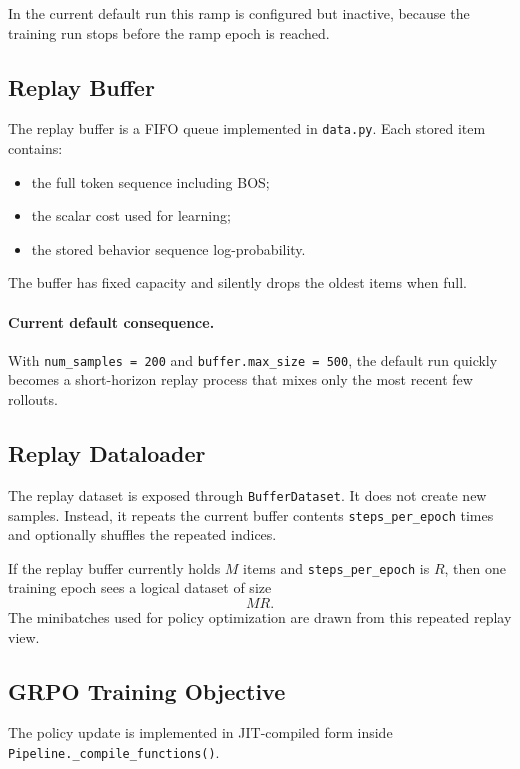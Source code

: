 \documentclass[11pt]{article}
\begin{document}
In the current default run this ramp is configured but inactive, because the training run stops before the ramp epoch is reached.

\subsection{Replay Buffer}

The replay buffer is a FIFO queue implemented in \texttt{data.py}. Each stored item contains:
\begin{itemize}[leftmargin=*]
\item the full token sequence including BOS;
\item the scalar cost used for learning;
\item the stored behavior sequence log-probability.
\end{itemize}

The buffer has fixed capacity and silently drops the oldest items when full.

\paragraph{Current default consequence.}
With \texttt{num\_samples = 200} and \texttt{buffer.max\_size = 500}, the default run quickly becomes a short-horizon replay process that mixes only the most recent few rollouts.

\subsection{Replay Dataloader}

The replay dataset is exposed through \texttt{BufferDataset}. It does not create new samples. Instead, it repeats the current buffer contents \texttt{steps\_per\_epoch} times and optionally shuffles the repeated indices.

If the replay buffer currently holds $M$ items and \texttt{steps\_per\_epoch} is $R$, then one training epoch sees a logical dataset of size
\[
MR.
\]
The minibatches used for policy optimization are drawn from this repeated replay view.

\subsection{GRPO Training Objective}

The policy update is implemented in JIT-compiled form inside \texttt{Pipeline.\_compile\_functions()}.
\end{document}
